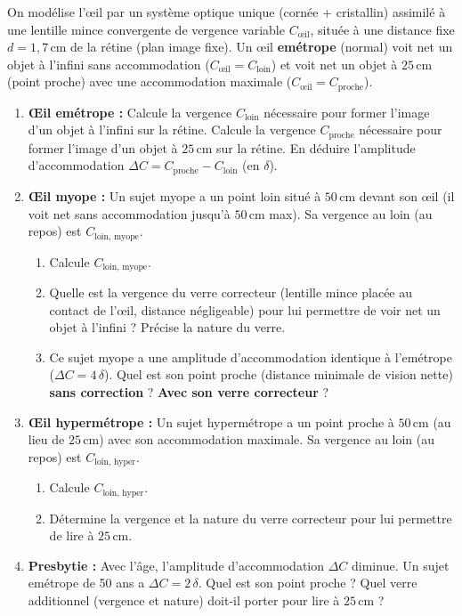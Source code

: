 \documentclass[11pt]{article}
\begin{document}
\begin{exercice}
On modélise l'œil par un système optique unique (cornée + cristallin) assimilé à une lentille mince convergente de vergence variable $C_{\text{œil}}$, située à une distance fixe $d = 1,7\,\text{cm}$ de la rétine (plan image fixe). Un œil \textbf{emétrope} (normal) voit net un objet à l'infini sans accommodation ($C_{\text{œil}} = C_{\text{loin}}$) et voit net un objet à $25\,\text{cm}$ (point proche) avec une accommodation maximale ($C_{\text{œil}} = C_{\text{proche}}$).
\begin{enumerate}
    \item \textbf{Œil emétrope :} Calcule la vergence $C_{\text{loin}}$ nécessaire pour former l'image d'un objet à l'infini sur la rétine. Calcule la vergence $C_{\text{proche}}$ nécessaire pour former l'image d'un objet à $25\,\text{cm}$ sur la rétine. En déduire l'amplitude d'accommodation $\Delta C = C_{\text{proche}} - C_{\text{loin}}$ (en $\delta$).
    \item \textbf{Œil myope :} Un sujet myope a un point loin situé à $50\,\text{cm}$ devant son œil (il voit net sans accommodation jusqu'à $50\,\text{cm}$ max). Sa vergence au loin (au repos) est $C_{\text{loin, myope}}$.
    \begin{enumerate}
        \item Calcule $C_{\text{loin, myope}}$.
        \item Quelle est la vergence du verre correcteur (lentille mince placée au contact de l'œil, distance négligeable) pour lui permettre de voir net un objet à l'infini ? Précise la nature du verre.
        \item Ce sujet myope a une amplitude d'accommodation identique à l'emétrope ($\Delta C = 4\,\delta$). Quel est son point proche (distance minimale de vision nette) \textbf{sans correction} ? \textbf{Avec son verre correcteur} ?
    \end{enumerate}
    \item \textbf{Œil hypermétrope :} Un sujet hypermétrope a un point proche à $50\,\text{cm}$ (au lieu de $25\,\text{cm}$) avec son accommodation maximale. Sa vergence au loin (au repos) est $C_{\text{loin, hyper}}$.
    \begin{enumerate}
        \item Calcule $C_{\text{loin, hyper}}$.
        \item Détermine la vergence et la nature du verre correcteur pour lui permettre de lire à $25\,\text{cm}$.
    \end{enumerate}
    \item \textbf{Presbytie :} Avec l'âge, l'amplitude d'accommodation $\Delta C$ diminue. Un sujet emétrope de 50 ans a $\Delta C = 2\,\delta$. Quel est son point proche ? Quel verre additionnel (vergence et nature) doit-il porter pour lire à $25\,\text{cm}$ ?
\end{enumerate}
\end{exercice}
\end{document}

